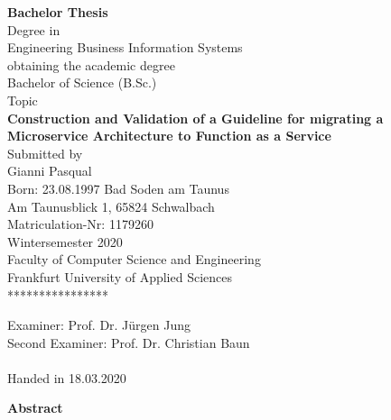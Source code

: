 \documentclass[a4paper,twoside,11pt, pagesize]{scrartcl}
\begin{document}
\begin{titlepage} 
  \begin{center} {\LARGE \textbf{Bachelor Thesis}}\\
     \vspace{1cm} Degree in\\
     {\large Engineering Business Information Systems}\\
     \vspace{1cm} obtaining the academic degree\\
     {\large Bachelor of Science (B.Sc.)}\\
     \vspace{1.5cm} Topic\\
     \vspace{0.5cm} {\LARGE \textbf{Construction and Validation of a Guideline for migrating a Microservice Architecture to Function as a Service}}\\
     \vspace{1cm} Submitted by\\
     \vspace{0.3cm} {\large Gianni Pasqual}\\
     \vspace{0.5cm} Born: 23.08.1997 Bad Soden am Taunus\\
     Am Taunusblick 1, 65824 Schwalbach\\
     \vspace{1.5cm} Matriculation-Nr: 1179260\\
     Wintersemester 2020 \\
     Faculty of Computer Science and Engineering\\
     Frankfurt University of Applied Sciences\\
     \vspace{0.5cm} **************** \vfill
  \end{center}
  {\large Examiner: Prof. Dr. Jürgen Jung}\\
  {\large Second Examiner: Prof. Dr. Christian Baun}\\\\
  Handed in 18.03.2020
\end{titlepage}
\newpage
{\Large \textbf {Abstract}}
\end{document}
